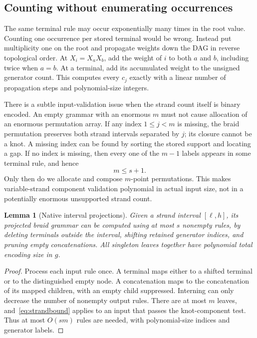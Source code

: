\documentclass[11pt,letterpaper]{article}
\newtheorem{lemma}[theorem]{Lemma}
\theoremstyle{definition}\newtheorem{definition}[theorem]{Definition}
\theoremstyle{remark}\newtheorem{remark}[theorem]{Remark}
\begin{document}
\subsection{Counting without enumerating occurrences}
The same terminal rule may occur exponentially many times in the root value. Counting one occurrence per stored terminal would be wrong. Instead put multiplicity one on the root and propagate weights down the DAG in reverse topological order. At $X_i=X_aX_b$, add the weight of $i$ to both $a$ and $b$, including twice when $a=b$. At a terminal, add its accumulated weight to the unsigned generator count. This computes every $c_j$ exactly with a linear number of propagation steps and polynomial-size integers.

There is a subtle input-validation issue when the strand count itself is binary encoded. An empty grammar with an enormous $m$ must not cause allocation of an enormous permutation array. If any index $1\le j<m$ is missing, the braid permutation preserves both strand intervals separated by $j$; its closure cannot be a knot. A missing index can be found by sorting the stored support and locating a gap. If no index is missing, then every one of the $m-1$ labels appears in some terminal rule, and hence
\begin{equation}\label{eq:strandbound}
 m\le s+1.
\end{equation}
Only then do we allocate and compose $m$-point permutations. This makes variable-strand component validation polynomial in actual input size, not in a potentially enormous unsupported strand count.

\begin{lemma}[Native interval projections]\label{lem:projection}
Given a strand interval $[\ell,h]$, its projected braid grammar can be computed using at most $s$ nonempty rules, by deleting terminals outside the interval, shifting retained generator indices, and pruning empty concatenations. All singleton leaves together have polynomial total encoding size in $g$.
\end{lemma}
\begin{proof}
Process each input rule once. A terminal maps either to a shifted terminal or to the distinguished empty node. A concatenation maps to the concatenation of its mapped children, with an empty child suppressed. Interning can only decrease the number of nonempty output rules. There are at most $m$ leaves, and~\eqref{eq:strandbound} applies to an input that passes the knot-component test. Thus at most $O(sm)$ rules are needed, with polynomial-size indices and generator labels.
\end{proof}
\end{document}
